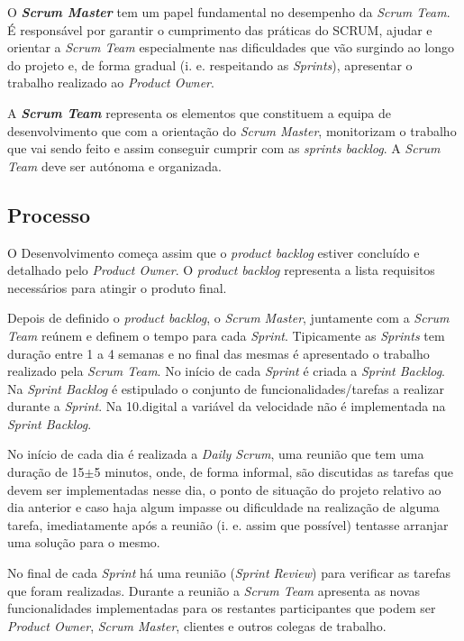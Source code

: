 O \textbf{\textit{Scrum Master}} tem um papel fundamental no desempenho da \textit{Scrum Team}. É responsável por garantir o cumprimento das práticas do SCRUM, ajudar e orientar a \textit{Scrum Team} especialmente nas dificuldades que vão surgindo ao longo do projeto e, de forma gradual (i. e. respeitando as \textit{Sprints}), apresentar o trabalho realizado ao \textit{Product Owner}.

A \textbf{\textit{Scrum Team}} representa os elementos que constituem a equipa de desenvolvimento que com a orientação do \textit{Scrum Master}, monitorizam o trabalho que vai sendo feito e assim conseguir cumprir com as \textit{sprints backlog}. A \textit{Scrum Team} deve ser autónoma e organizada.

\subsection{Processo}

O Desenvolvimento começa assim que o \textit{product backlog} estiver concluído e detalhado pelo \textit{Product Owner}. O \textit{product backlog} representa a lista requisitos necessários para atingir o produto final. 

Depois de definido o \textit{product backlog}, o \textit{Scrum Master}, juntamente com a \textit{Scrum Team} reúnem e definem o tempo para cada \textit{Sprint}. Tipicamente as \textit{Sprints} tem duração entre 1 a 4 semanas e no final das mesmas é apresentado o trabalho realizado pela \textit{Scrum Team}. No início de cada \textit{Sprint} é criada a \textit{Sprint Backlog}. Na \textit{Sprint Backlog} é estipulado o conjunto de funcionalidades/tarefas a realizar durante a \textit{Sprint}. Na 10.digital a variável da velocidade não é implementada na \textit{Sprint Backlog}.

No início de cada dia é realizada a \textit{Daily Scrum}, uma reunião que tem uma duração de 15$\pm$5 minutos, onde, de forma informal, são discutidas as tarefas que devem ser implementadas nesse dia, o ponto de situação do projeto relativo ao dia anterior e caso haja algum impasse ou dificuldade na realização de alguma tarefa, imediatamente após a reunião (i. e. assim que possível) tentasse arranjar uma solução para o mesmo. 

No final de cada \textit{Sprint} há uma reunião (\textit{Sprint Review}) para verificar as tarefas que foram realizadas. Durante a reunião a \textit{Scrum Team} apresenta as novas funcionalidades implementadas para os restantes participantes que podem ser \textit{Product Owner}, \textit{Scrum Master}, clientes e outros colegas de trabalho. 

